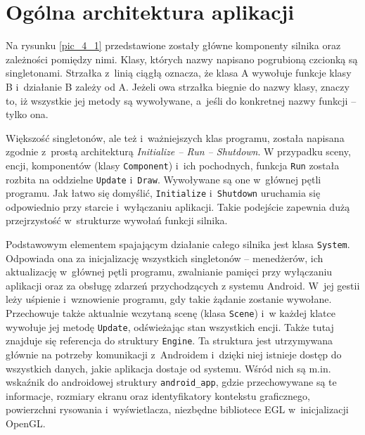 	\section{Ogólna architektura aplikacji}
	\label{t:praktyka:ogolne}
	
	
	Na rysunku \ref{pic_4_1} przedstawione zostały główne komponenty silnika oraz zależności pomiędzy nimi. Klasy, których nazwy napisano pogrubioną czcionką są singletonami. Strzałka z~linią ciągłą oznacza, że klasa A wywołuje funkcje klasy B i~działanie B zależy od A. Jeżeli owa strzałka biegnie do nazwy klasy, znaczy to, iż wszystkie jej metody są wywoływane, a~jeśli do konkretnej nazwy funkcji -- tylko ona.
	
	
	Większość singletonów, ale też i~ważniejszych klas programu, została napisana zgodnie z~prostą architekturą \emph{Initialize -- Run -- Shutdown}. W przypadku sceny, encji, komponentów (klasy \texttt{Component}) i~ich pochodnych, funkcja \texttt{Run} została rozbita na oddzielne \texttt{Update} i~\texttt{Draw}. Wywoływane są one w~głównej pętli programu. Jak łatwo się domyślić, \texttt{Initialize} i~\texttt{Shutdown} uruchamia się odpowiednio przy starcie i~wyłączaniu aplikacji. Takie podejście zapewnia dużą przejrzystość w~strukturze wywołań funkcji silnika.
	
	Podstawowym elementem spajającym działanie całego silnika jest klasa \texttt{System}. Odpowiada ona za inicjalizację wszystkich singletonów -- menedżerów, ich aktualizację w~głównej pętli programu, zwalnianie pamięci przy wyłączaniu aplikacji oraz za obsługę zdarzeń przychodzących z systemu Android. W~jej gestii leży uśpienie i~wznowienie programu, gdy takie żądanie zostanie wywołane. Przechowuje także aktualnie wczytaną scenę (klasa \texttt{Scene}) i~w każdej klatce wywołuje jej metodę \texttt{Update}, odświeżając stan wszystkich encji. Także tutaj znajduje się referencja do struktury \texttt{Engine}. Ta struktura jest utrzymywana głównie na potrzeby komunikacji z~Androidem i~dzięki niej istnieje dostęp do wszystkich danych, jakie aplikacja dostaje od systemu. Wśród nich są m.in. wskaźnik do androidowej struktury \texttt{android\_app}, gdzie przechowywane są te informacje, rozmiary ekranu oraz identyfikatory kontekstu graficznego, powierzchni rysowania i~wyświetlacza, niezbędne bibliotece EGL w~inicjalizacji OpenGL.
	
